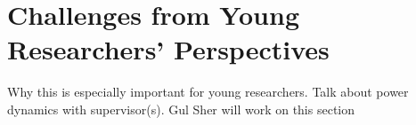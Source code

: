 \section{Challenges from Young Researchers' Perspectives}
Why this is especially important for young researchers. Talk about power dynamics with supervisor(s).
Gul Sher will work on this section